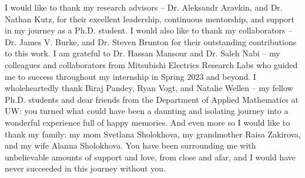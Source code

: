 I would like to thank my research advisors -- Dr. Aleksandr Aravkin, and Dr. Nathan Kutz, for their excellent leadership, continuous mentorship, and support in my journey as a Ph.D. student. I would also like to thank my collaborators -- Dr. James V. Burke, and Dr. Steven Brunton for their outstanding contributions to this work. I am grateful to Dr. Hassan Mansour and Dr. Saleh Nabi -- my colleagues and collaborators from Mitsubishi Electrics Research Labs who guided me to success throughout my internship in Spring 2023 and beyond. I wholeheartedly thank Biraj Pandey, Ryan Vogt, and Natalie Wellen -- my fellow Ph.D. students and dear friends from the Department of Applied Mathematics at UW: you turned what could have been a daunting and isolating journey into a wonderful experience full of happy memories. And even more so I would like to thank my family: my mom Svetlana Sholokhova, my grandmother Raisa Zakirova, and my wife Alanna Sholokhova. You have been surrounding me with unbelievable amounts of support and love, from close and afar, and I would have never succeeded in this journey without you. 